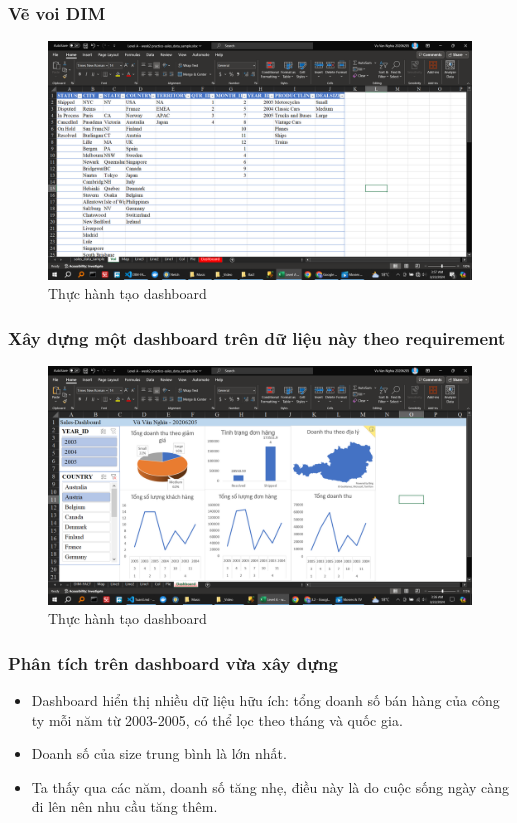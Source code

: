 \documentclass{article}
\begin{document}
\subsubsection{Vẽ voi DIM}

\begin{figure}[H]
\centering
\includegraphics[scale = 0.15]{Bai2/ThucHanh/voi.png}
\caption{Thực hành tạo dashboard}
\end{figure}

\subsubsection{Xây dựng một dashboard trên dữ liệu này theo requirement}

\begin{figure}[H]
\centering
\includegraphics[scale = 0.15]{Bai2/ThucHanh/dashboard.png}
\caption{Thực hành tạo dashboard}
\end{figure}

\subsubsection{Phân tích trên dashboard vừa xây dựng}

\begin{itemize}

\item Dashboard hiển thị nhiều dữ liệu hữu ích: tổng doanh số bán hàng của công ty mỗi năm từ 2003-2005, có thể lọc theo tháng và quốc gia.
\item Doanh số của size trung bình là lớn nhất.
\item Ta thấy qua các năm, doanh số tăng nhẹ, điều này là do cuộc sống ngày càng đi lên nên nhu cầu tăng thêm.

\end{itemize}
\end{document}
